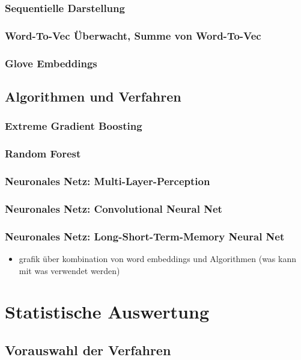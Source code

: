 \documentclass[a4paper,11pt]{article}
\begin{document}
\subsubsection{Sequentielle Darstellung}
\subsubsection{Word-To-Vec Überwacht, Summe von Word-To-Vec}
\subsubsection{Glove Embeddings} \label{Kap:Glove}


\subsection{Algorithmen und Verfahren}

\subsubsection{Extreme Gradient Boosting}
\subsubsection{Random Forest}
\subsubsection{Neuronales Netz: Multi-Layer-Perception}
\subsubsection{Neuronales Netz: Convolutional Neural Net}
\subsubsection{Neuronales Netz: Long-Short-Term-Memory Neural Net}

\begin{itemize}
    \item grafik über kombination von word embeddings und Algorithmen (was kann mit was verwendet werden)
\end{itemize}{}


\section{Statistische Auswertung}

\subsection{Vorauswahl der Verfahren}
\end{document}
